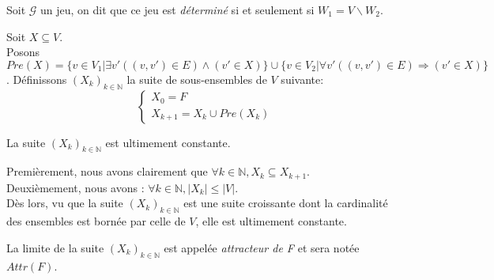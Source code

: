 	\begin{defi}
		Soit $\mathcal{G}$ un jeu, on dit que ce jeu est \textit{déterminé} si et seulement si $W_{1} = V \backslash W_{2}$.
	\end{defi}

	\begin{defi}
		\label{def:predecesseur}
		 Soit $X \subseteq V$.\\ 
		Posons $Pre(X) = \{ v \in V_{1}| \exists v'((v,v')\in E) \wedge (v' \in X)\} \cup \{ v \in V_{2}|\forall v' ((v,v')\in E) \Rightarrow (v' \in X)\}$.
		Définissons $(X_{k})_{k \in \mathbb{N}}$ la suite de sous-ensembles de $V$ suivante: \\
		
			$$\left\lbrace
			  \begin{array}{c}
			   X_{0} = F \\
			   X_{k+1} = X_{k} \cup Pre(X_{k})
		       \end{array}
			\right. $$
		
	\end{defi}
	
	
	\begin{propriete}
		\label{prop:suiteUltConst}
		La suite $(X_{k})_{k \in \mathbb{N}}$ est ultimement constante. 
	\end{propriete}
	\begin{demonstration}
		Premièrement, nous avons clairement que  $\forall k \in \mathbb{N}, X_{k} \subseteq X_{k+1}$.\\
		Deuxièmement, nous avons : $\forall k \in \mathbb{N}, |X_{k}| \leq |V| $.\\
		Dès lors, vu que la suite $(X_{k})_{k \in \mathbb{N}}$ est une suite croissante dont la cardinalité des ensembles est bornée par celle de $V$, elle est ultimement constante.\\
		
	\end{demonstration}
	
	
	
	\begin{defi}
		La limite de la suite $(X_{k})_{k \in \mathbb{N}}$ est appelée \textit{attracteur de F} et sera notée $Attr(F)$.
	\end{defi}
	

